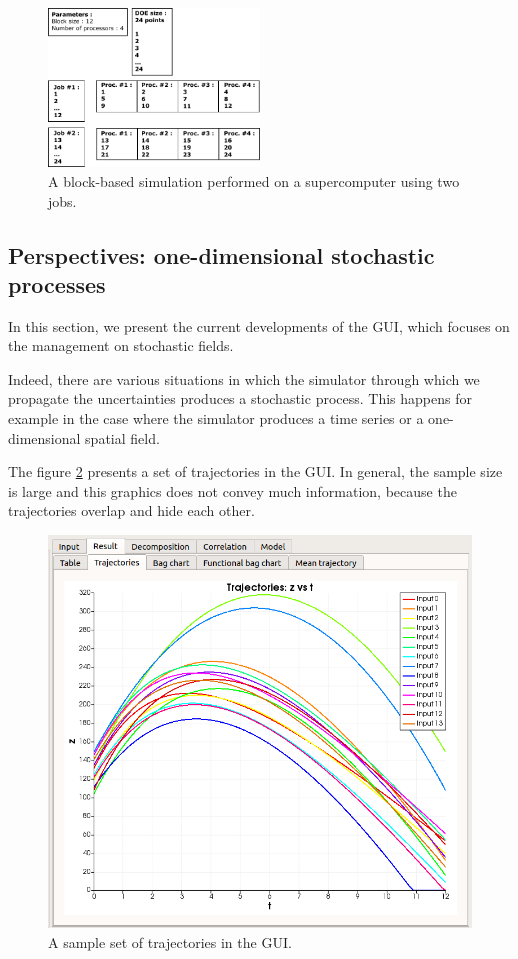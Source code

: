 \documentclass{article}
\begin{document}
\begin{figure}
\centering
\includegraphics[width=0.5\textwidth]{figures/SALOME-OpenTURNS-simulation-byblock.pdf}
\caption{A block-based simulation performed on a supercomputer using two jobs.}
\label{fig-blockalgo}
\end{figure}



\subsection{Perspectives: one-dimensional stochastic processes}

In this section, we present the current developments of the GUI, which focuses on the 
management on stochastic fields. 

Indeed, there are various situations in which the simulator through which we propagate the 
uncertainties produces a stochastic process. 
This happens for example in the case where the simulator produces a time series or 
a one-dimensional spatial field. 

The figure \ref{fig-trajectories} presents a set of trajectories in the GUI. 
In general, the sample size is large and this graphics does not convey much information, 
because the trajectories overlap and hide each other. 

\begin{figure}
\centering
\includegraphics[width=\textwidth]{figures/central_tendency_trajectories-focus.png}
\caption{A sample set of trajectories in the GUI.}
\label{fig-trajectories}
\end{figure}
\end{document}

